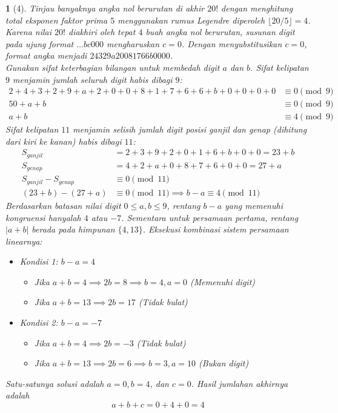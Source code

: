 \documentclass[11pt,a4paper,DIV=12]{scrartcl}
\theoremstyle{problemstyle}
\theoremstyle{answerstyle}
\newtheorem{answer}{}
\begin{document}
\begin{answer}[4]
  Tinjau banyaknya angka nol berurutan di akhir $20!$ dengan menghitung total eksponen faktor prima $5$ menggunakan rumus Legendre diperoleh
  $ \lfloor 20/5 \rfloor = 4 $.
  Karena nilai $20!$ diakhiri oleh tepat $4$ buah angka nol berurutan, susunan digit pada ujung format $\dots bc000$ mengharuskan $c = 0$.
  Dengan menyubstitusikan $c=0$, format angka menjadi $24329a20081766b0000$.\\
  Gunakan sifat keterbagian bilangan untuk membedah digit $a$ dan $b$.
  Sifat kelipatan $9$ menjamin jumlah seluruh digit habis dibagi $9$:
  \begin{align*}
    2+4+3+2+9+a+2+0+0+8+1+7+6+6+b+0+0+0+0 & \equiv 0 \pmod 9 \\
    50 + a + b                            & \equiv 0 \pmod 9 \\
    a + b                                 & \equiv 4 \pmod 9
  \end{align*}
  Sifat kelipatan $11$ menjamin selisih jumlah digit posisi ganjil dan genap (dihitung dari kiri ke kanan) habis dibagi $11$:
  \begin{align*}
    S_{ganjil}             & = 2+3+9+2+0+1+6+b+0+0 = 23+b                         \\
    S_{genap}              & = 4+2+a+0+8+7+6+0+0 = 27+a                           \\
    S_{ganjil} - S_{genap} & \equiv 0 \pmod{11}                                   \\
    (23+b) - (27+a)        & \equiv 0 \pmod{11} \implies b - a \equiv 4 \pmod{11}
  \end{align*}
  Berdasarkan batasan nilai digit $0 \le a,b \le 9$, rentang $b-a$ yang memenuhi kongruensi hanyalah $4$ atau $-7$. Sementara untuk persamaan pertama, rentang $|a+b|$ berada pada himpunan $\{4, 13\}$.
  Eksekusi kombinasi sistem persamaan linearnya:
  \begin{itemize}
    \item Kondisi 1: $b - a = 4$
          \begin{itemize}
            \item Jika $a + b = 4 \implies 2b = 8 \implies b = 4, a = 0$ (Memenuhi digit)
            \item Jika $a + b = 13 \implies 2b = 17$ (Tidak bulat)
          \end{itemize}
    \item Kondisi 2: $b - a = -7$
          \begin{itemize}
            \item Jika $a + b = 4 \implies 2b = -3$ (Tidak bulat)
            \item Jika $a + b = 13 \implies 2b = 6 \implies b = 3, a = 10$ (Bukan digit)
          \end{itemize}
  \end{itemize}
  Satu-satunya solusi adalah $a=0, b=4$, dan $c=0$.
  Hasil jumlahan akhirnya adalah
  $$ a+b+c = 0+4+0 = \boxed{4} $$
\end{answer}
\end{document}
